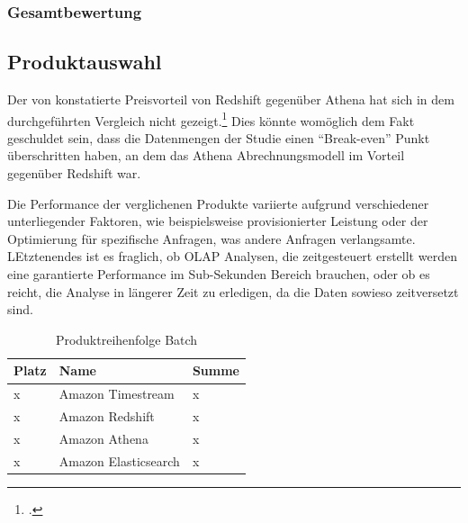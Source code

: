 \subsubsection{Gesamtbewertung}

\subsection{Produktauswahl}
Der von \citeauthor{Tan.2019} konstatierte Preisvorteil von Redshift gegenüber Athena hat sich in dem durchgeführten Vergleich nicht gezeigt.\footcite[Vgl.][2178\psq]{Tan.2019} Dies könnte womöglich dem Fakt geschuldet sein, dass die Datenmengen der Studie einen \enquote{Break-even} Punkt überschritten haben, an dem das Athena Abrechnungsmodell im Vorteil gegenüber Redshift war.

Die Performance der verglichenen Produkte variierte aufgrund verschiedener unterliegender Faktoren, wie beispielsweise provisionierter Leistung oder der Optimierung für spezifische Anfragen, was andere Anfragen verlangsamte. LEtztenendes ist es fraglich, ob \ac{OLAP} Analysen, die zeitgesteuert erstellt werden eine garantierte Performance im Sub-Sekunden Bereich brauchen, oder ob es reicht, die Analyse in längerer Zeit zu erledigen, da die Daten sowieso zeitversetzt sind.

\begin{table}[H]
\centering
\begin{tabular}{|l|l|l|}
\hline
Platz & Name & Summe \\ \hline
x & Amazon Timestream & \cellcolor[HTML]{DAE8FC}x \\ \hline
x & Amazon Redshift & \cellcolor[HTML]{DAE8FC}x \\ \hline
x & Amazon Athena & \cellcolor[HTML]{DAE8FC}x \\ \hline
x & Amazon Elasticsearch & \cellcolor[HTML]{DAE8FC}x \\ \hline
\end{tabular}
\caption{Produktreihenfolge Batch}
\label{tab:Reihenfolge-Batch}
\end{table}
